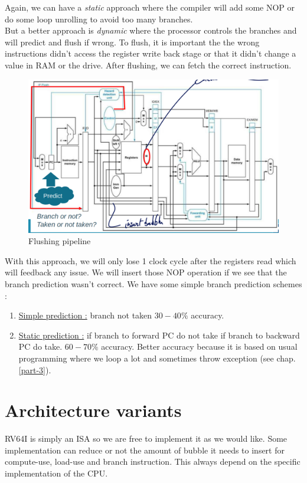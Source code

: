 \documentclass{report}
\begin{document}
Again, we can have a \textit{static} approach where the compiler will add some NOP or do some loop unrolling to avoid too many branches.\\

But a better approach is \textit{dynamic} where the processor controls the branches and will predict and flush if wrong. To flush, it is important the the wrong instructions didn't access the register write back stage or that it didn't change a value in RAM or the drive. After flushing, we can fetch the correct instruction.

\begin{figure}[H]
    \centering
    \includegraphics[width=0.75\linewidth]{flushing_pipeline.png}
    \caption{Flushing pipeline}
    \label{fig:flush-label}
\end{figure}

With this approach, we will only lose 1 clock cycle after the registers read which will feedback any issue. We will insert those NOP operation if we see that the branch prediction wasn't correct. We have some simple branch prediction schemes : 

\begin{enumerate}
    \item \underline{Simple prediction :} branch not taken $30-40 \%$ accuracy.
    \item \underline{Static prediction :} if branch to forward PC do not take if branch to backward PC do take. $60-70 \%$ accuracy. Better accuracy because it is based on usual programming where we loop a lot and sometimes throw exception (see chap. \ref{part-3}).
\end{enumerate}

\section{Architecture variants}

RV64I is simply an ISA so we are free to implement it as we would like. Some implementation can reduce or not the amount of bubble it needs to insert for compute-use, load-use and branch instruction. This always depend on the specific implementation of the CPU.
\end{document}
